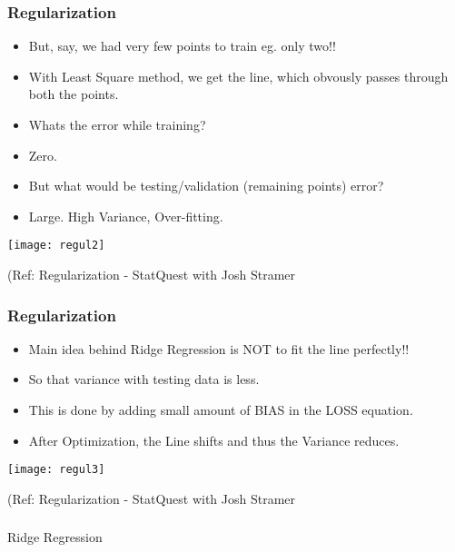 \begin{frame}[fragile]\frametitle{Regularization}
\begin{itemize}
\item But, say, we had very few points to train eg. only two!!
\item With Least Square method, we get the line, which obvously passes through both the points.
\item Whats the error while training?
\item Zero.
\item But what would be testing/validation (remaining points) error?
\item Large. High Variance, Over-fitting.
\end{itemize}

\begin{center}
\texttt{[image: regul2]}
\end{center}

{\tiny (Ref: Regularization - StatQuest with Josh Stramer}
\end{frame}

\begin{frame}[fragile]\frametitle{Regularization}
\begin{itemize}
\item Main idea behind Ridge Regression is NOT to fit the line perfectly!! 
\item So that variance with testing data is less.
\item This is done by adding small amount of BIAS in the LOSS equation. 
\item After Optimization, the Line shifts and thus the Variance reduces.
\end{itemize}

\begin{center}
\texttt{[image: regul3]}
\end{center}

{\tiny (Ref: Regularization - StatQuest with Josh Stramer}
\end{frame}

\begin{frame}[fragile]\frametitle{}
\begin{center}
{\Large Ridge Regression}
\end{center}
\end{frame}



